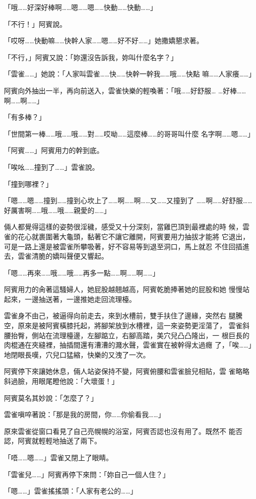 「哦……好深好棒啊……嗯……嗯……快動……快動……」

「不行！」阿賓說。

「哎呀……快動嘛……快幹人家……嗯……好不好……」她撒嬌懇求著。

「不行，」阿賓又說：「妳還沒告訴我，妳叫什麼名字？」

「雲雀……」她說：「人家叫雲雀……快……快幹一幹我……哦……快點
嘛……人家癢……」

阿賓向外抽出一半，再向前送入，雲雀快樂的輕喚著：「哦……好舒服…
…好棒……啊……啊……」

「有多棒？」

「世間第一棒……哦……哦……對……哎呦……這麼棒……的哥哥叫什麼
名字啊……嗯……」

「阿賓……」阿賓用力的幹到底。

「唉吆……撞到了……」雲雀說。

「撞到哪裡？」

「嗯……嗯……撞到……撞到心坎上了……啊……啊……又……又撞到了
……啊……好舒服……好厲害啊……哦……哦……親愛的……」

倆人都覺得這樣的姿勢很淫穢，感受又十分深刻，當雞巴頂到最裡處的時
候，雲雀的花心就裹圍著大龜頭，黏著它不讓它離開，阿賓要用力抽拔才能將
它退出，可是一路上還是被雲雀所攀吸著，好不容易等到退至洞口，馬上就忍
不住回插進去，雲雀清脆的嬌叫聲便又響起。

「嗯……再來……哦……哦……再多一點……啊……啊……」

阿賓用力的肏著這騷婦人，她屁股越翹越高，阿賓乾脆捧著她的屁股和她
慢慢站起來，一邊抽送著，一邊推她走回流理檯。

雲雀身不由己，被逼得向前走去，來到水槽前，雙手扶住了邊緣，突然右
腿騰空，原來是被阿賓橫膝托起，將腳架放到水槽裡，這一來姿勢更淫蕩了，
雲雀斜腰抬臀，側站在流理檯邊，左腳踮立，右腳高踏，美穴兒凸凸隆出，一
根巨長的肉棍通在夾縫裡，抽插間還有漕漕的濺水聲，雲雀實在被幹得太過癮
了，「唉……」地閉眼長嘆，穴兒口猛縮，快樂的又洩了一次。

阿賓停下來讓她休息，倆人站姿保持不變，阿賓俯腰和雲雀臉兒相貼，雲
雀略略斜過臉，用眼尾瞪他說：「大壞蛋！」

阿賓莫名其妙說：「怎麼了？」

雲雀嗔啐著說：「那是我的房間，你……你偷看我……」

原來雲雀從窗口看見了自己亮幌幌的浴室，阿賓否認也沒有用了。既然不
能否認，阿賓就輕輕地抽送了兩下。

「唔……嗯……」雲雀又閉上了眼睛。

「雲雀兒……」阿賓再停下來問：「妳自己一個人住？」

「嗯……」雲雀搖搖頭：「人家有老公的……」

